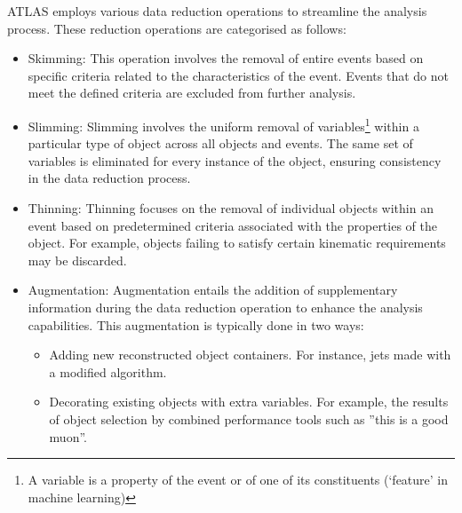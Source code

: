 ATLAS employs various data reduction operations to streamline the analysis process.
These reduction operations are categorised as follows:
\begin{itemize}
	\item Skimming: This operation involves the removal of entire events based on specific 
		criteria related to the characteristics of the event. Events that do not meet the defined 
		criteria are excluded from further analysis.
	
	\item Slimming: Slimming involves the uniform removal of variables\footnote{A 
		variable is a property of the event or of one of its constituents (‘feature’ in
		machine learning)} within a particular type of 
		object across all objects and events. The same set of variables is eliminated for every 
		instance of the object, ensuring consistency in the data reduction process.
	
	\item Thinning: Thinning focuses on the removal of individual objects within an event based on 
		predetermined criteria associated with the properties of the object. For example, objects
		failing to satisfy certain kinematic requirements may be discarded.

	\item Augmentation: Augmentation entails the addition of supplementary information during the 
		data reduction operation to enhance the analysis capabilities. This augmentation is typically
		done in two ways:
		\begin{itemize}
			\item Adding new reconstructed object containers. For instance,  jets made with a modified algorithm.
			\item Decorating existing objects with extra variables. For example, the results of object selection by 
				combined performance tools such as ''this is a good muon''.
		\end{itemize}
\end{itemize}

